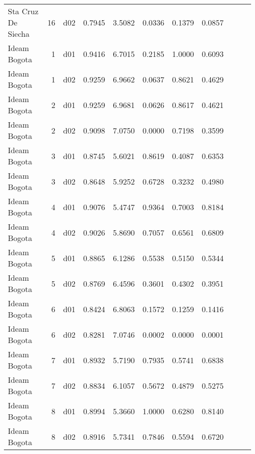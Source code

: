 \begin{landscape}
\begin{longtable}{p{2cm}rrrrrrrrrr}
      Sta Cruz De Siecha  &         16 &     d02 &   0.7945 &  3.5082 &        0.0336 &           0.1379 &  0.0857 \\
            Ideam Bogota  &          1 &     d01 &   0.9416 &  6.7015 &        0.2185 &           1.0000 &  0.6093 \\
            Ideam Bogota  &          1 &     d02 &   0.9259 &  6.9662 &        0.0637 &           0.8621 &  0.4629 \\
            Ideam Bogota  &          2 &     d01 &   0.9259 &  6.9681 &        0.0626 &           0.8617 &  0.4621 \\
            Ideam Bogota  &          2 &     d02 &   0.9098 &  7.0750 &        0.0000 &           0.7198 &  0.3599 \\
            Ideam Bogota  &          3 &     d01 &   0.8745 &  5.6021 &        0.8619 &           0.4087 &  0.6353 \\
            Ideam Bogota  &          3 &     d02 &   0.8648 &  5.9252 &        0.6728 &           0.3232 &  0.4980 \\
            Ideam Bogota  &          4 &     d01 &   0.9076 &  5.4747 &        0.9364 &           0.7003 &  0.8184 \\
            Ideam Bogota  &          4 &     d02 &   0.9026 &  5.8690 &        0.7057 &           0.6561 &  0.6809 \\
            Ideam Bogota  &          5 &     d01 &   0.8865 &  6.1286 &        0.5538 &           0.5150 &  0.5344 \\
            Ideam Bogota  &          5 &     d02 &   0.8769 &  6.4596 &        0.3601 &           0.4302 &  0.3951 \\
            Ideam Bogota  &          6 &     d01 &   0.8424 &  6.8063 &        0.1572 &           0.1259 &  0.1416 \\
            Ideam Bogota  &          6 &     d02 &   0.8281 &  7.0746 &        0.0002 &           0.0000 &  0.0001 \\
            Ideam Bogota  &          7 &     d01 &   0.8932 &  5.7190 &        0.7935 &           0.5741 &  0.6838 \\
            Ideam Bogota  &          7 &     d02 &   0.8834 &  6.1057 &        0.5672 &           0.4879 &  0.5275 \\
            Ideam Bogota  &          8 &     d01 &   0.8994 &  5.3660 &        1.0000 &           0.6280 &  0.8140 \\
            Ideam Bogota  &          8 &     d02 &   0.8916 &  5.7341 &        0.7846 &           0.5594 &  0.6720 \\

\end{longtable}
\end{landscape}
